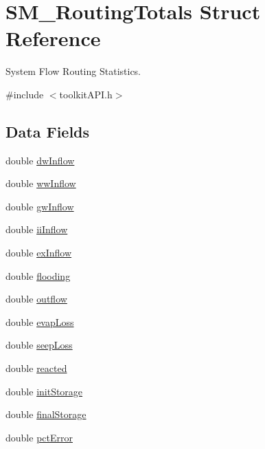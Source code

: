 \hypertarget{struct_s_m___routing_totals}{}\section{S\+M\+\_\+\+Routing\+Totals Struct Reference}
\label{struct_s_m___routing_totals}


System Flow Routing Statistics.  




{\ttfamily \#include $<$toolkit\+A\+P\+I.\+h$>$}

\subsection*{Data Fields}
\begin{DoxyCompactItemize}
\item 
double \hyperlink{struct_s_m___routing_totals_a2ba50058866e2c864a95e5d8f91ec880}{dw\+Inflow}
\item 
double \hyperlink{struct_s_m___routing_totals_addf6c3df2db37a38a6f6d64a585f9b50}{ww\+Inflow}
\item 
double \hyperlink{struct_s_m___routing_totals_a2c11b6011754787a9180be20704af814}{gw\+Inflow}
\item 
double \hyperlink{struct_s_m___routing_totals_a8a0c006b8764f6a17349262044f997ca}{ii\+Inflow}
\item 
double \hyperlink{struct_s_m___routing_totals_a16d57de84cbbf43c3bd19fd011792c1b}{ex\+Inflow}
\item 
double \hyperlink{struct_s_m___routing_totals_af224d4ef44bc7427a3aadfcb36008782}{flooding}
\item 
double \hyperlink{struct_s_m___routing_totals_acdc4839742c90f3ca60e8243b8631b1b}{outflow}
\item 
double \hyperlink{struct_s_m___routing_totals_a041b11f3c42dc3f9ffe2d3112e3ecc0e}{evap\+Loss}
\item 
double \hyperlink{struct_s_m___routing_totals_af23b8cac0bd9aa9dab61553ddc423443}{seep\+Loss}
\item 
double \hyperlink{struct_s_m___routing_totals_a97407af14eadcba842d2dfc60c256612}{reacted}
\item 
double \hyperlink{struct_s_m___routing_totals_add0f27c9cc788302f259ee9a4c9b2f48}{init\+Storage}
\item 
double \hyperlink{struct_s_m___routing_totals_ae2e8a073faa2b013982ffc0fedf9e376}{final\+Storage}
\item 
double \hyperlink{struct_s_m___routing_totals_a061bfec118db4216f0062258ce029ec2}{pct\+Error}
\end{DoxyCompactItemize}


